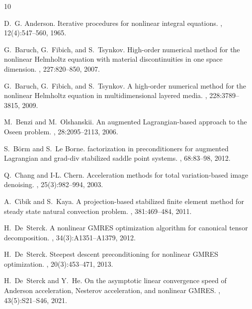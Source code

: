 \documentclass{article}
\numberwithin{equation}{section}
\begin{document}
%
%

\begin{thebibliography}{10}

D.~G. Anderson.
\newblock Iterative procedures for nonlinear integral equations.
, 12(4):547--560, 1965.

G.~Baruch, G.~Fibich, and S.~Tsynkov.
\newblock High-order numerical method for the nonlinear {H}elmholtz equation
  with material discontinuities in one space dimension.
, 227:820--850, 2007.

G.~Baruch, G.~Fibich, and S.~Tsynkov.
\newblock A high-order numerical method for the nonlinear {H}elmholtz equation
  in multidimensional layered media.
, 228:3789--3815, 2009.

M.~Benzi and M.~Olshanskii.
\newblock An augmented {L}agrangian-based approach to the {O}seen problem.
, 28:2095--2113, 2006.

S.~B\"orm and S.~{Le Borne}.
 factorization in preconditioners for augmented {L}agrangian
  and grad-div stabilized saddle point systems.
,
  68:83--98, 2012.

Q.~Chang and I-L. Chern.
\newblock Acceleration methods for total variation-based image denoising.
, 25(3):982--994, 2003.

A.~Cibik and S.~Kaya.
\newblock A projection-based stabilized finite element method for steady state
  natural convection problem.
,
  381:469--484, 2011.

H.~De~Sterck.
\newblock A nonlinear {GMRES} optimization algorithm for canonical tensor
  decomposition.
, 34(3):A1351--A1379, 2012.

H.~De~Sterck.
\newblock Steepest descent preconditioning for nonlinear {GMRES} optimization.
, 20(3):453--471,
  2013.

H.~De~Sterck and Y.~He.
\newblock On the asymptotic linear convergence speed of {A}nderson
  acceleration, {N}esterov acceleration, and nonlinear {GMRES}.
, 43(5):S21--S46, 2021.


\end{thebibliography}
\end{document}
